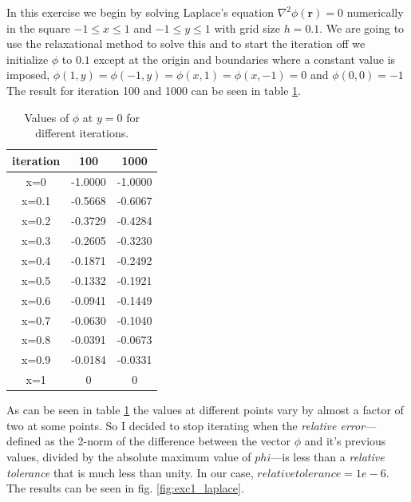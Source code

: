 In this exercise we begin by solving Laplace's equation $\nabla^2 \phi(\mathbf{r}) = 0$ numerically in the square $-1\le x \le 1$ and $-1\le y \le 1$ with grid size $h=0.1$.
We are going to use the relaxational method to solve this and to start the iteration off we initialize $\phi$
to $0.1$ except at the origin and boundaries where a constant value is imposed, $\phi(1,y) = \phi(-1,y) = \phi(x,1) = \phi(x,-1) = 0$ and $\phi(0,0) = -1$
The result for iteration 100 and 1000 can be seen in table \ref{table:exc1_laplace}.
\begin{table}[h!]
\caption{Values of $\phi$ at $y=0$ for different iterations.}
\center
\begin{tabular}{|c|c|c|}
\hline 
iteration & 100 & 1000 \\ 
\hline 
x=0 & -1.0000 & -1.0000 \\ 
\hline 
x=0.1 & -0.5668 & -0.6067 \\ 
\hline 
x=0.2 & -0.3729 & -0.4284 \\ 
\hline 
x=0.3 & -0.2605 &  -0.3230 \\ 
\hline 
x=0.4 & -0.1871 & -0.2492 \\ 
\hline 
x=0.5 & -0.1332 & -0.1921 \\ 
\hline 
x=0.6 & -0.0941 & -0.1449 \\ 
\hline 
x=0.7 & -0.0630 & -0.1040 \\ 
\hline 
x=0.8 &  -0.0391 & -0.0673 \\ 
\hline 
x=0.9 & -0.0184 & -0.0331 \\ 
\hline 
x=1 & 0 & 0 \\ 
\hline 
\end{tabular}
\label{table:exc1_laplace}
\end{table}
\FloatBarrier

As can be seen in table \ref{table:exc1_laplace} the values at different points vary by almost a factor of two at some points. So I decided to stop iterating when the \emph{relative error}---defined as the 2-norm of the difference between the vector $\phi$ and it's previous values, divided by the absolute maximum value of $phi$---is less than a \emph{relative tolerance} that is much less than unity. In our case, $relative tolerance = 1e-6$.
The results can be seen in fig. \ref{fig:exc1_laplace}.
 
